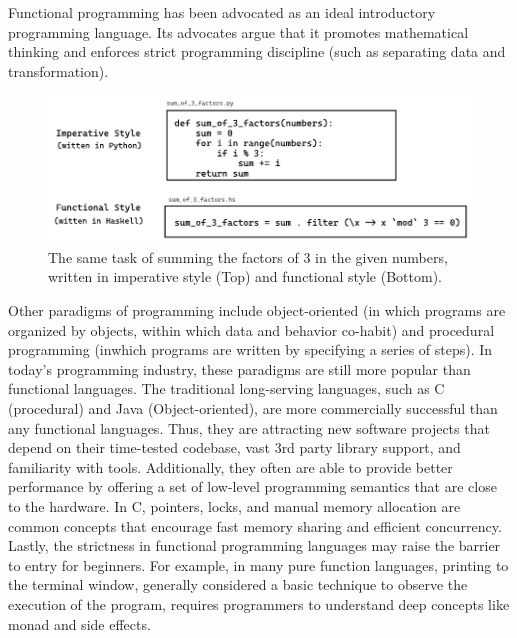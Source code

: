 Functional programming has been advocated as an ideal introductory programming language. Its advocates argue that it promotes mathematical thinking and enforces strict programming discipline (such as separating data and transformation). 

\begin{figure}[hbt]
  \includegraphics[width=\linewidth]{ImperativeFunctional}
  \caption{
    \label{fig:imperative-vs-functional}
   The same task of summing the factors of 3 in the given numbers, written in imperative style (Top) and functional style (Bottom).
    }
\end{figure}

Other paradigms of programming include object-oriented (in which programs are organized by objects, within which data and behavior co-habit) and procedural programming (inwhich programs are written by specifying a series of steps). In today's programming industry, these paradigms are still more popular than functional languages. The traditional long-serving languages, such as C (procedural) and Java (Object-oriented), are more commercially successful than any functional languages. Thus, they are attracting new software projects that depend on their time-tested codebase, vast 3rd party library support, and familiarity with tools. Additionally, they often are able to provide better performance by offering a set of low-level programming semantics that are close to the hardware. In C, pointers, locks, and manual memory allocation are common concepts that encourage fast memory sharing and efficient concurrency. Lastly, the strictness in functional programming languages may raise the barrier to entry for beginners. For example, in many pure function languages, printing to the terminal window, generally considered a basic technique to observe the execution of the program, requires programmers to understand deep concepts like monad and side effects.  


